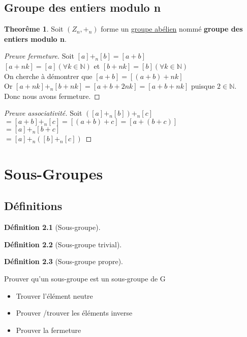\documentclass[12pt]{book}
\let\Bbb\mathbb
\def\sep{\phantom{}}
\theoremstyle{definition}
\newtheorem{definition}{Définition}[section]
\newtheorem{theorem}{Theorême}[section]
\begin{document}
\section{Groupe des entiers modulo n}
\begin{theorem}
    \label{thm:groupe_modulo}
    Soit $(Z_n, +_n)$ forme un \hyperref[def:groupe_abelien]{groupe abélien} nommé \textbf{groupe des entiers modulo n}.
\end{theorem}
\begin{proof}[Preuve fermeture]
    Soit $[a] +_n [b] = [a + b]$ \sep \\
    $[a + nk] = [a](\forall k \in \Bbb N)$ et $[b + nk] = [b](\forall k \in \Bbb N)$ \sep \\
    On cherche à démontrer que $[a + b] = [(a + b) + nk]$ \sep \\
    Or $[a + nk] +_n [b + nk] = [a + b + 2nk] = [a + b + nk]$ puisque $2 \in \Bbb N$. \sep \\
    Donc nous avons fermeture.
\end{proof}
\begin{proof}[Preuve associativité]
    Soit $([a] +_n [b]) +_n [c]$ \sep \\
    $= [a + b] +_n [c] = [(a + b) + c] = [a + (b + c)]$ \sep \\
    $= [a] +_n [b + c]$ \sep \\
    $= [a] +_n ([b] + _n [c])$
\end{proof}

\chapter{Sous-Groupes}
\section{Définitions}
\begin{definition}[Sous-groupe]
    \label{def:sous_groupe}
    
\end{definition}

\begin{definition}[Sous-groupe trivial]
    \label{def:sous_groupe_trivial}
    
\end{definition}

\begin{definition}[Sous-groupe propre]
    \label{def:sous_groupe_propre}
    
\end{definition}
Prouver qu'un sous-groupe est un sous-groupe de G
\begin{itemize}
    \item Trouver l'élément neutre
    \item Prouver /trouver les éléments inverse
    \item Prouver la fermeture
\end{itemize}
\appendix
\end{document}
